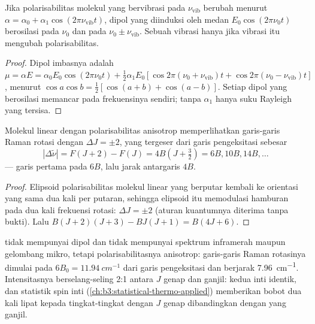 \begin{proposition}\label{prop:b3:rovibrational-spectroscopy:raman-classical}
Jika polarisabilitas molekul yang bervibrasi pada $\nu_{\mathrm{vib}}$ berubah
menurut $\alpha = \alpha_0 + \alpha_1\cos(2\pi\nu_{\mathrm{vib}}t)$, dipol yang
diinduksi oleh medan $E_0\cos(2\pi\nu_0t)$ berosilasi pada $\nu_0$ dan pada
$\nu_0 \pm \nu_{\mathrm{vib}}$. Sebuah vibrasi hanya  jika vibrasi itu
mengubah polarisabilitas.
\end{proposition}

\begin{proof}
Dipol imbasnya adalah $\mu = \alpha E = \alpha_0E_0\cos(2\pi\nu_0t) + \frac12\alpha_1E_0[\cos2\pi(\nu_0 +
\nu_{\mathrm{vib}})t + \cos2\pi(\nu_0 - \nu_{\mathrm{vib}})t]$, menurut $\cos a\cos b =
\frac12[\cos(a+b) + \cos(a-b)]$. Setiap dipol yang berosilasi memancar pada
frekuensinya sendiri; tanpa $\alpha_1$ hanya suku Rayleigh yang tersisa.
\end{proof}

\begin{proposition}\label{prop:b3:rovibrational-spectroscopy:rotational-raman}
Molekul linear dengan polarisabilitas anisotrop memperlihatkan garis-garis
Raman rotasi dengan $\Delta J = \pm2$, yang tergeser dari garis pengeksitasi sebesar
\[
|\Delta\tilde\nu| = F(J+2) - F(J) = 4B(J + \tfrac32) = 6B, 10B, 14B, \dots
\]
--- garis pertama pada $6B$, lalu jarak antargaris $4B$.
\end{proposition}

\begin{proof}
Elipsoid polarisabilitas molekul linear yang berputar kembali ke orientasi
yang sama dua kali per putaran, sehingga elipsoid itu memodulasi hamburan pada
dua kali frekuensi rotasi: $\Delta J = \pm2$ (aturan kuantumnya diterima tanpa
bukti). Lalu $B(J+2)(J+3) - BJ(J+1) = B(4J + 6)$.
\end{proof}

\begin{example}\label{ex:b3:rovibrational-spectroscopy:n2}
 tidak mempunyai dipol dan tidak mempunyai spektrum inframerah maupun
gelombang mikro, tetapi polarisabilitasnya anisotrop: garis-garis Raman
rotasinya dimulai pada $6B_0 =
\qty{11.94}{cm^{-1}}$ dari garis pengeksitasi
dan berjarak \qty{7.96}{cm^{-1}}. Intensitasnya berselang-seling 2:1 antara $J$
genap dan ganjil: kedua inti  identik, dan statistik spin inti
(\cref{ch:b3:statistical-thermo-applied}) memberikan bobot dua kali lipat
kepada tingkat-tingkat dengan $J$ genap dibandingkan dengan yang ganjil.
\end{example}

